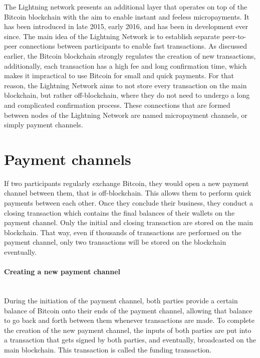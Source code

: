 \documentclass[a4paper, 12pt]{report}
\begin{document}
\par The Lightning network presents an additional layer that operates on top of the Bitcoin blockchain with the aim to enable instant and feeless micropayments. It has been introduced in late 2015, early 2016, and has been in development ever since. The main idea of the Lightning Network is to establish separate peer-to-peer connections between participants to enable fast transactions. As discussed earlier, the Bitcoin blockchain strongly regulates the creation of new transactions, additionally, each transaction has a high fee and long confirmation time, which makes it impractical to use Bitcoin for small and quick payments. For that reason, the Lightning Network aims to not store every transaction on the main blockchain, but rather off-blockchain, where they do not need to undergo a long and complicated confirmation process. These connections that are formed between nodes of the Lightning Network are named micropayment channels, or simply payment channels.

\section{Payment channels}

\par If two participants regularly exchange Bitcoin, they would open a new payment channel between them, that is off-blockchain. This allows them to perform quick payments between each other. Once they conclude their business, they conduct a closing transaction which contains the final balances of their wallets on the payment channel. Only the initial and closing transaction are stored on the main blockchain. That way, even if thousands of transactions are performed on the payment channel, only two transactions will be stored on the blockchain eventually.

\paragraph{Creating a new payment channel} \hspace{0pt} \\
During the initiation of the payment channel, both parties provide a certain balance of Bitcoin onto their ends of the payment channel, allowing that balance to go back and forth between them whenever transactions are made. To complete the creation of the new payment channel, the inputs of both parties are put into a transaction that gets signed by both parties, and eventually, broadcasted on the main blockchain. This transaction is called the funding transaction.
\end{document}
